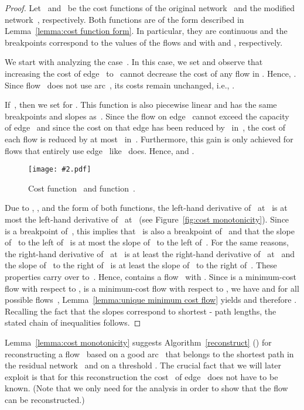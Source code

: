 \documentclass[11pt]{article}
\newcommand{\GFX}[2][]{\texttt{[image: \#2.pdf]}}
\newenvironment{fig}
{\begin{figure}[th]\begin{center}}
{\end{center}\end{figure}}
\newenvironment{GFXFIG}[2][]
{\begin{fig}\GFX[#1]{#2}}
{\end{fig}}
\begin{document}
\begin{proof}
Let~ and~ be the cost functions of the original network~ and the modified network~, respectively.
Both functions are of the form described in Lemma~\ref{lemma:cost function form}. In particular, they are continuous and the breakpoints correspond to the values of the flows  and  with  and , respectively.

We start with analyzing the case~. In this case, we set  and observe that increasing the cost of edge~ to~ cannot decrease the cost of any flow in . Hence, . Since flow~ does not use arc~, its costs remain unchanged, i.e., .

If~, then we set  for . This function is also piecewise linear and has the same breakpoints and slopes as~. Since the flow on edge~ cannot exceed the capacity~ of edge~ and since the cost on that edge has been reduced by~ in~, the cost of each flow is reduced by at most~ in~. Furthermore, this gain is only achieved for flows that entirely use edge~ like~ does. Hence,  and .

\begin{GFXFIG}[width=0.5\textwidth]{CostMonotonicity}
\caption{Cost function~ and function~.}
\label{fig:cost monotonicity}
\end{GFXFIG}

Due to , , and the form of both
functions, the left-hand derivative of~ at~ is at most the
left-hand derivative of~ at~ (see Figure~\ref{fig:cost
monotonicity}). Since~ is a breakpoint of~, this implies that~
is also a breakpoint of~ and that the slope of~ to the left 
of~ is at most the slope of~ to the left of~.
For the same reasons, the right-hand derivative of~ at~ is at
least the right-hand derivative of~ at~ and the slope 
of~ to the right of~ is at least the slope of~ to the right of~.
These properties carry over to~. Hence,  contains a flow~ with . Since  is a minimum-cost flow with respect to ,  is a minimum-cost flow with respect to , we have  and  for all possible flows~, Lemma~\ref{lemma:unique minimum cost flow} yields  and therefore . Recalling the fact that the slopes correspond
to shortest - path lengths, the stated chain of inequalities follows.
\end{proof}

Lemma~\ref{lemma:cost monotonicity} suggests Algorithm~\ref{reconstruct} () for reconstructing a flow~ based on a good arc~ that belongs to the shortest path in the residual network~ and on a threshold . The crucial fact that we will later exploit is that for this reconstruction the cost~ of edge~ does not have to be known.
(Note that we only need  for the analysis in order to show that the flow~ can be reconstructed.)
\end{document}
